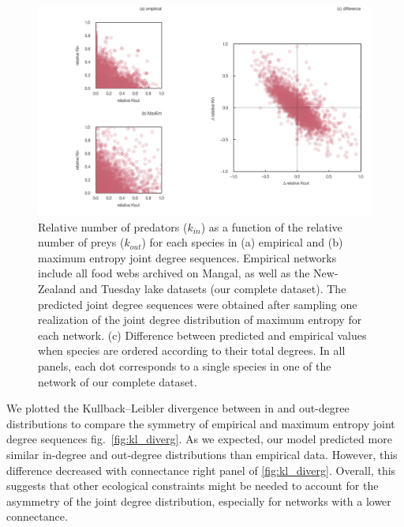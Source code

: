 \documentclass[10pt,oneside]{article}
\makeatletter
\def\maxwidth{\ifdim\Gin@nat@width>\linewidth\linewidth
\else\Gin@nat@width\fi}
\let\Oldincludegraphics\includegraphics
\renewcommand{\includegraphics}[1]{\Oldincludegraphics[width=\maxwidth]{#1}}
\makeatother
\begin{document}
\begin{figure}
\hypertarget{fig:joint_dd}{%
\centering
\includegraphics{figures/joint_degree_dist.png}
\caption{Relative number of predators (\(k_{in}\)) as a function of the
relative number of preys (\(k_{out}\)) for each species in (a) empirical
and (b) maximum entropy joint degree sequences. Empirical networks
include all food webs archived on Mangal, as well as the New-Zealand and
Tuesday lake datasets (our complete dataset). The predicted joint degree
sequences were obtained after sampling one realization of the joint
degree distribution of maximum entropy for each network. (c) Difference
between predicted and empirical values when species are ordered
according to their total degrees. In all panels, each dot corresponds to
a single species in one of the network of our complete
dataset.}\label{fig:joint_dd}
}
\end{figure}

We plotted the Kullback--Leibler divergence between in and out-degree
distributions to compare the symmetry of empirical and maximum entropy
joint degree sequences fig.~\ref{fig:kl_diverg}. As we expected, our
model predicted more similar in-degree and out-degree distributions than
empirical data. However, this difference decreased with connectance
right panel of \ref{fig:kl_diverg}. Overall, this suggests that other
ecological constraints might be needed to account for the asymmetry of
the joint degree distribution, especially for networks with a lower
connectance.
\end{document}
